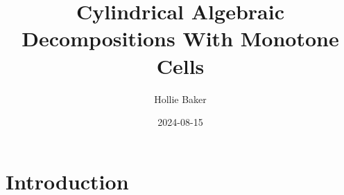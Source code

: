 \documentclass[
]{book}
\title{Cylindrical Algebraic Decompositions With Monotone Cells}
\author{Hollie Baker}
\date{2024-08-15}
\theoremstyle{definition}
\theoremstyle{definition}
\theoremstyle{definition}
\theoremstyle{definition}
\theoremstyle{remark}
\begin{document}
\maketitle

{
\setcounter{tocdepth}{1}
\tableofcontents
}
\hypertarget{intro}{%
\chapter{Introduction}\label{intro}}

\newcommand{\R}{\mathbb{R}}
\newcommand{\Q}{\mathbb{Q}}
\newcommand{\N}{\mathbb{N}}
\newcommand{\Z}{\mathbb{Z}}
\newcommand{\A}{\mathbb{A}}

\newcommand{\sign}{\operatorname{sign}}
\newcommand{\proj}{\operatorname{proj}}
\newcommand{\lcm}{\operatorname{lcm}}
\newcommand{\lc}{\operatorname{lc}}
\newcommand{\lm}{\operatorname{lm}}
\newcommand{\ldt}{\operatorname{lt}}
\newcommand{\multideg}{\operatorname{multideg}}
\newcommand{\red}{\operatorname{red}}
\newcommand{\prim}{\operatorname{prim}}
\newcommand{\psrc}{\operatorname{psrc}}
\newcommand{\res}{\operatorname{Res}}
\newcommand{\lex}{<_{\rm{lex}}}
\newcommand{\lexeq}{\le_{\rm{lex}}}
\newcommand{\projop}[1]{{\proj_{\R^{#1}}}}

\newcommand{\projops}[1]{{\proj_{\opspan{#1}}}}
\newcommand{\opspan}[1]{{\operatorname{span} \{#1\}}}
\newcommand{\fr}[1]{{\operatorname{fr} \left( #1 \right)}}
\newcommand{\cl}[1]{{\operatorname{cl} \left( #1 \right)}}

\newcommand{\frt}{{\rm{fr}}}
\newcommand{\cls}{{\rm{cl}}}
\end{document}
